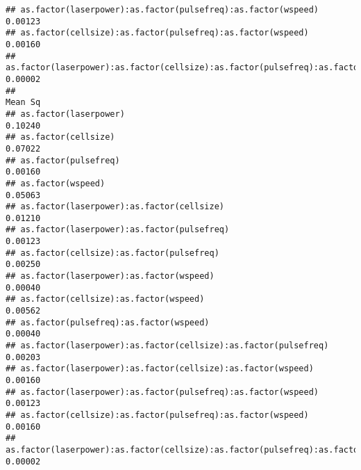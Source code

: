 \documentclass[
]{article}
\begin{document}
\begin{verbatim}
## as.factor(laserpower):as.factor(pulsefreq):as.factor(wspeed)                     0.00123
## as.factor(cellsize):as.factor(pulsefreq):as.factor(wspeed)                       0.00160
## as.factor(laserpower):as.factor(cellsize):as.factor(pulsefreq):as.factor(wspeed) 0.00002
##                                                                                  Mean Sq
## as.factor(laserpower)                                                            0.10240
## as.factor(cellsize)                                                              0.07022
## as.factor(pulsefreq)                                                             0.00160
## as.factor(wspeed)                                                                0.05063
## as.factor(laserpower):as.factor(cellsize)                                        0.01210
## as.factor(laserpower):as.factor(pulsefreq)                                       0.00123
## as.factor(cellsize):as.factor(pulsefreq)                                         0.00250
## as.factor(laserpower):as.factor(wspeed)                                          0.00040
## as.factor(cellsize):as.factor(wspeed)                                            0.00562
## as.factor(pulsefreq):as.factor(wspeed)                                           0.00040
## as.factor(laserpower):as.factor(cellsize):as.factor(pulsefreq)                   0.00203
## as.factor(laserpower):as.factor(cellsize):as.factor(wspeed)                      0.00160
## as.factor(laserpower):as.factor(pulsefreq):as.factor(wspeed)                     0.00123
## as.factor(cellsize):as.factor(pulsefreq):as.factor(wspeed)                       0.00160
## as.factor(laserpower):as.factor(cellsize):as.factor(pulsefreq):as.factor(wspeed) 0.00002
\end{verbatim}
\end{document}
